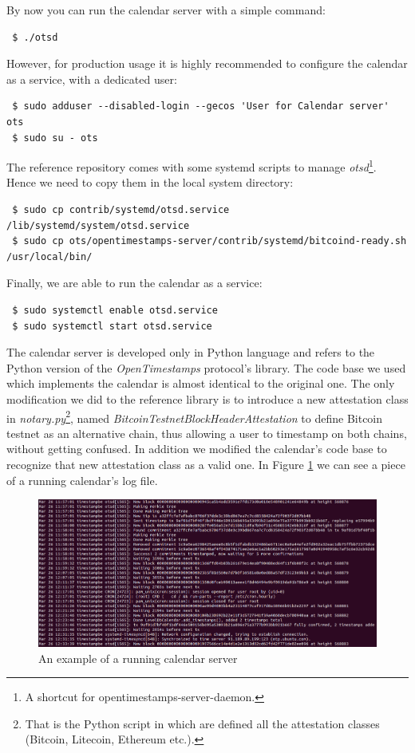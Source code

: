\bigskip
\noindent
By now you can run the calendar server with a simple command:
\begin{lstlisting}
 $ ./otsd
\end{lstlisting}

\bigskip
\noindent
However, for production usage it is highly recommended to configure the calendar as a service, with a dedicated user:
\begin{lstlisting}
 $ sudo adduser --disabled-login --gecos 'User for Calendar server' ots
 $ sudo su - ots
\end{lstlisting}

\bigskip
\noindent
The reference repository comes with some systemd scripts to manage \textit{otsd}\textup{\footnote{A shortcut for opentimestamps-server-daemon.}}. Hence we need to copy them in the local system directory:
\begin{lstlisting}
 $ sudo cp contrib/systemd/otsd.service /lib/systemd/system/otsd.service
 $ sudo cp ots/opentimestamps-server/contrib/systemd/bitcoind-ready.sh /usr/local/bin/
\end{lstlisting}

\bigskip
\noindent
Finally, we are able to run the calendar as a service:
\begin{lstlisting}
 $ sudo systemctl enable otsd.service
 $ sudo systemctl start otsd.service
\end{lstlisting}

\bigskip
\noindent
The calendar server is developed only in Python language and refers to the Python version of the \textit{OpenTimestamps} protocol's library. The code base we used which implements the calendar is almost identical to the original one. The only modification we did to the reference library is to introduce a new attestation class in \textit{notary.py}\textup{\footnote{That is the Python script in which are defined all the attestation classes (Bitcoin, Litecoin, Ethereum etc.).}}, named \textit{BitcoinTestnetBlockHeaderAttestation} to define Bitcoin testnet as an alternative chain, thus allowing a user to timestamp on both chains, without getting confused. In addition we modified the calendar's code base to recognize that new attestation class as a valid one. In Figure \ref{fig:backend} we can see a piece of a running calendar's log file.

\begin{figure}[h!]
    \centering
	\includegraphics[width=1\linewidth]{Images/backend.png}
	\caption{An example of a running calendar server}
	\label{fig:backend}
\end{figure}

